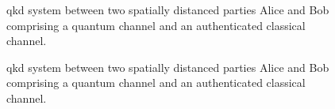 \begin{figure}[htb]
	\centering
	
	\caption{\Gls{qkd} system between two spatially distanced parties Alice and Bob comprising a quantum channel and an authenticated classical channel.}
\end{figure}

\begin{figure}[htb]
	\centering
	
	\caption{\Gls{qkd} system between two spatially distanced parties Alice and Bob comprising a quantum channel and an authenticated classical channel.}
\end{figure}